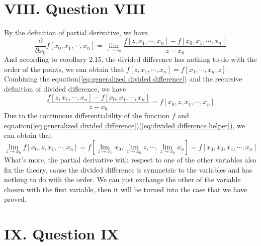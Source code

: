 \documentclass[a4paper]{article}
\begin{document}
\section*{VIII. Question VIII}
By the definition of partial derivative, we have
\begin{equation}
  \frac{\partial}{\partial x_0}f[x_0,x_1,\cdots,x_n]=\lim_{z\to x_0}\frac{f[z,x_1,\cdots,x_n]-f[x_0,x_1,\cdots,x_n]}{z-x_0} \label{eq:generalized divided difference}
\end{equation}
And according to corollary 2.15, the divided difference has nothing to do with the order of the points, we can obtain that $f[z,x_1,\cdots,x_n]=f[x_1,\cdots,x_n,z]$.
Combining the equation(\ref{eq:generalized divided difference}) and the recursive definition of divided difference, we have
\begin{equation}
  \frac{f[z,x_1,\cdots,x_n]-f[x_0,x_1,\cdots,x_n]}{z-x_0}=f[x_0,z,x_1,\cdots,x_n] \label{eq:divided difference helper}
\end{equation}
Due to the continuous differentiability of the function $f$ and equation(\ref{eq:generalized divided difference})(\ref{eq:divided difference helper}), we can obtain that
\begin{equation}
  \lim_{z\to x_0}f[x_0,z,x_1,\cdots,x_n]=f[\lim_{z\to x_0}x_0,\lim_{z\to x_0}z,\cdots,\lim_{z\to x_0}x_n]=f[x_0,x_0,x_1,\cdots,x_n]
\end{equation}
What's more, the partial derivative with respect to one of the other variables also fix the theory, cause the divided difference is symmetric to the variables and has nothing to do with the order.
We can just exchange the other of the variable chosen with the first variable, then it will be turned into the case that we have proved.

\section*{IX. Question IX}
\end{document}
